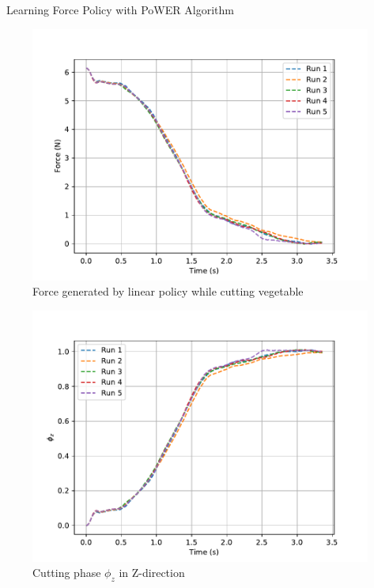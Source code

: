 \documentclass[aspectratio=43,10pt,fleqn,t]{beamer}
\begin{document}
	
	\begin{frame}{~}{\small Learning Force Policy with PoWER Algorithm}
		
		\begin{minipage}[t]{0.49\textwidth}
			\begin{figure}
				\includegraphics[width=\textwidth]{images/exp/cut/power_f1}
				\caption{\scriptsize Force generated by linear policy while cutting vegetable}
			\end{figure}
		\end{minipage}
		\hfill
		\begin{minipage}[t]{0.49\textwidth}
			
			\begin{figure}
				\includegraphics[width=\textwidth]{images/exp/cut/power_ph_z1}
				\caption{\scriptsize Cutting phase $\phi_{z}$ in Z-direction}
			\end{figure}
		\end{minipage}
	\end{frame}
	
\end{document}
